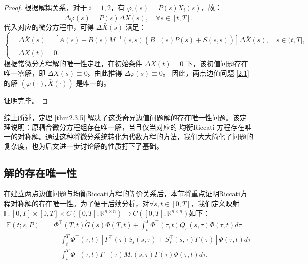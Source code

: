 \documentclass{GZUbachelorthesis}
\begin{document}
\begin{proof}
	根据解耦关系，对于 $i=1,2$，有 $\varphi_i(s) = P(s)\bar{X}_i(s)$，故：
	\begin{equation}\label{2.39}
		\Delta \varphi(s) = P(s) \Delta \bar{X}(s), \quad \forall s \in [t, T].
	\end{equation}
	代入对应的微分方程中，可得 $\Delta \bar{X}(s)$ 满足：
	\begin{equation*}
		\left\{
		\begin{aligned}
			&\dot{\Delta \bar{X}}(s) = [A(s) - B(s)M^{-1}(s, s)(B^\top(s)P(s) + S(s, s))] \Delta \bar{X}(s), \quad s \in (t, T], \\
			&\Delta \bar{X}(t) = 0.
		\end{aligned}
		\right.
	\end{equation*}
	根据常微分方程解的唯一性定理，在初始条件 $\Delta \bar{X}(t) = 0$ 下，该初值问题存在唯一零解，即 $\Delta \bar{X}(s) \equiv 0$。由此推得 $\Delta \varphi(s) \equiv 0$。
	因此，两点边值问题 \eqref{2.1} 的解 $(\varphi(\cdot), \bar{X}(\cdot))$ 是唯一的。
	
	证明完毕。
\end{proof}
\vspace{1em}
综上所述，定理 \ref{thm2.3.5} 解决了这类奇异边值问题解的存在唯一性问题。该定理说明：原耦合微分方程组存在唯一解，当且仅当对应的 均衡Riccati 方程存在唯一的对称解。通过这种将微分系统转化为代数方程的方法，我们大大简化了问题的复杂度，也为后文进一步讨论解的性质打下了基础。
\subsection{解的存在唯一性}
在建立两点边值问题与均衡Riccati方程的等价关系后，本节将重点证明Riccati方程对称解的存在唯一性。为了便于后续分析，对$\forall s, t \in [0, T]$，我们定义映射 $\mathbb{F}:[0, T] \times [0, T] \times C([0, T]; \mathbb{R}^{n\times n})\rightarrow C([0, T]; \mathbb{R}^{n\times n})$如下：
\begin{equation}\label{4.22}
	\begin{aligned}
		\mathbb{F}(t; s, P) &= \Phi^\top(T, t)\dot{G}(s)\Phi(T, t) + \int_t^T \Phi^\top(\tau, t)Q_s(s, \tau)\Phi(\tau, t) d\tau \\
		&\quad - \int_t^T \Phi^\top(\tau, t) \left[ \Gamma^\top(\tau)S_s(s, \tau) + S_s^\top(s, \tau)\Gamma(\tau) \right] \Phi(\tau, t) d\tau \\
		&\quad + \int_t^T \Phi^\top(\tau, t)\Gamma^\top(\tau)M_s(s, \tau)\Gamma(\tau)\Phi(\tau, t) d\tau. 
	\end{aligned}
\end{equation}
\end{document}
